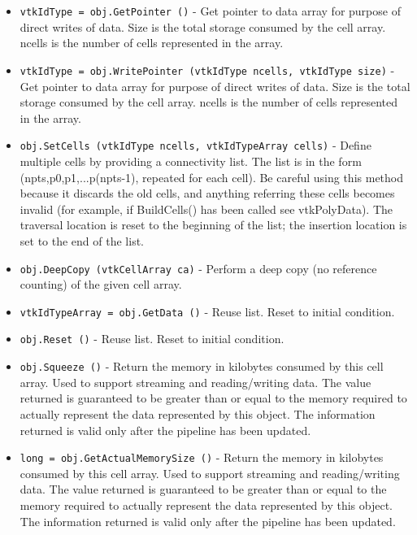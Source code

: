 \begin{itemize}
\item  \verb|vtkIdType = obj.GetPointer ()| -  Get pointer to data array for purpose of direct writes of data. Size is the
 total storage consumed by the cell array. ncells is the number of cells
 represented in the array.

\item  \verb|vtkIdType = obj.WritePointer (vtkIdType ncells, vtkIdType size)| -  Get pointer to data array for purpose of direct writes of data. Size is the
 total storage consumed by the cell array. ncells is the number of cells
 represented in the array.

\item  \verb|obj.SetCells (vtkIdType ncells, vtkIdTypeArray cells)| -  Define multiple cells by providing a connectivity list. The list is in
 the form (npts,p0,p1,...p(npts-1), repeated for each cell). Be careful
 using this method because it discards the old cells, and anything
 referring these cells becomes invalid (for example, if BuildCells() has
 been called see vtkPolyData).  The traversal location is reset to the
 beginning of the list; the insertion location is set to the end of the
 list.

\item  \verb|obj.DeepCopy (vtkCellArray ca)| -  Perform a deep copy (no reference counting) of the given cell array.

\item  \verb|vtkIdTypeArray = obj.GetData ()| -  Reuse list. Reset to initial condition.

\item  \verb|obj.Reset ()| -  Reuse list. Reset to initial condition.

\item  \verb|obj.Squeeze ()| -  Return the memory in kilobytes consumed by this cell array. Used to
 support streaming and reading/writing data. The value returned is
 guaranteed to be greater than or equal to the memory required to
 actually represent the data represented by this object. The 
 information returned is valid only after the pipeline has 
 been updated.

\item  \verb|long = obj.GetActualMemorySize ()| -  Return the memory in kilobytes consumed by this cell array. Used to
 support streaming and reading/writing data. The value returned is
 guaranteed to be greater than or equal to the memory required to
 actually represent the data represented by this object. The 
 information returned is valid only after the pipeline has 
 been updated.

\end{itemize}
